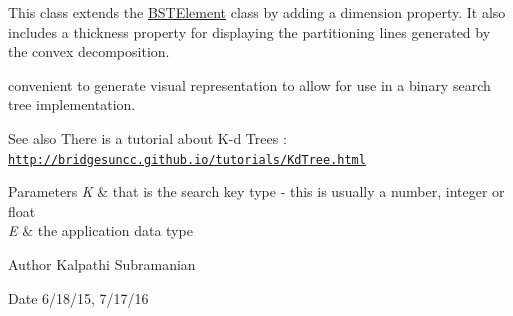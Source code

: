This class extends the \mbox{\hyperlink{classbridges_1_1datastructure_1_1_b_s_t_element}{B\+S\+T\+Element}} class by adding a dimension property. It also includes a thickness property for displaying the partitioning lines generated by the convex decomposition.

convenient to generate visual representation to allow for use in a binary search tree implementation.

\begin{DoxySeeAlso}{See also}
There is a tutorial about K-\/d Trees \+: \href{http://bridgesuncc.github.io/tutorials/KdTree.html}{\tt http\+://bridgesuncc.\+github.\+io/tutorials/\+Kd\+Tree.\+html}
\end{DoxySeeAlso}

\begin{DoxyParams}{Parameters}
{\em K} & that is the search key type -\/ this is usually a number, integer or float \\
\hline
{\em E} & the application data type\\
\hline
\end{DoxyParams}
\begin{DoxyAuthor}{Author}
Kalpathi Subramanian 
\end{DoxyAuthor}
\begin{DoxyDate}{Date}
6/18/15, 7/17/16 
\end{DoxyDate}
